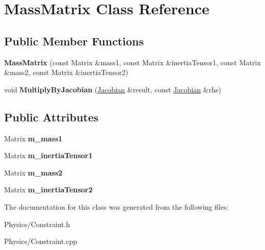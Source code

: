 \hypertarget{classMassMatrix}{}\section{Mass\+Matrix Class Reference}
\label{classMassMatrix}
\subsection*{Public Member Functions}
\begin{DoxyCompactItemize}
\item 
\mbox{\label{classMassMatrix_aa4c5b355fc163d71b4b776c0e3043d2e}} 
{\bfseries Mass\+Matrix} (const Matrix \&mass1, const Matrix \&inertia\+Tensor1, const Matrix \&mass2, const Matrix \&inertia\+Tensor2)
\item 
\mbox{\label{classMassMatrix_a2e5a4cd3710baa07395e07b03c2cd49c}} 
void {\bfseries Multiply\+By\+Jacobian} (\hyperlink{classJacobian}{Jacobian} \&result, const \hyperlink{classJacobian}{Jacobian} \&rhs)
\end{DoxyCompactItemize}
\subsection*{Public Attributes}
\begin{DoxyCompactItemize}
\item 
\mbox{\label{classMassMatrix_a2c37f7ad4cc7553509916fc610218cc5}} 
Matrix {\bfseries m\+\_\+mass1}
\item 
\mbox{\label{classMassMatrix_af2baea4cdb4613fe0a6c5b20adf3eadd}} 
Matrix {\bfseries m\+\_\+inertia\+Tensor1}
\item 
\mbox{\label{classMassMatrix_a58913e2b6b14fe9b50d34ee73f03518b}} 
Matrix {\bfseries m\+\_\+mass2}
\item 
\mbox{\label{classMassMatrix_a1decec128b8df0fafcc0a2948e653085}} 
Matrix {\bfseries m\+\_\+inertia\+Tensor2}
\end{DoxyCompactItemize}


The documentation for this class was generated from the following files\+:\begin{DoxyCompactItemize}
\item 
Physics/Constraint.\+h\item 
Physics/Constraint.\+cpp\end{DoxyCompactItemize}
